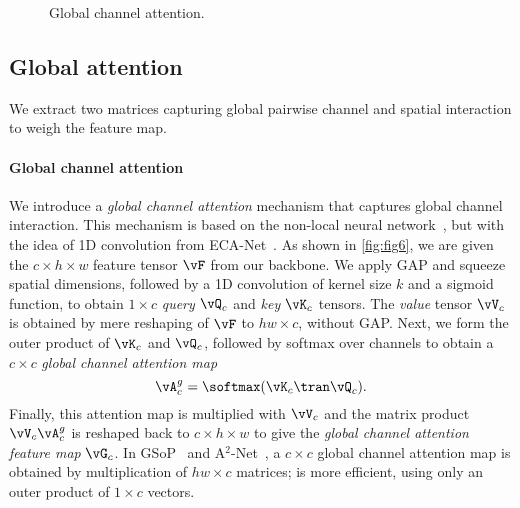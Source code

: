 \begin{figure}
\centering

\caption{Global channel attention.}
\label{fig:fig6}
\end{figure}


\subsection{Global attention}
\label{sec:global}

We extract two matrices capturing global pairwise channel and spatial interaction to weigh the feature map.


\paragraph{Global channel attention}

We introduce a \emph{global channel attention} mechanism that captures global channel interaction. This mechanism is based on the non-local neural network~\cite{Wang02}, but with the idea of 1D convolution from ECA-Net~\cite{wang01}. As shown in \autoref{fig:fig6}, we are given the $c\times h\times w$ feature tensor $\vF$ from our backbone. We apply GAP and squeeze spatial dimensions, followed by a 1D convolution of kernel size $k$ and a sigmoid function, to obtain $1 \times c$ \emph{query} $\vQ_c$ and \emph{key} $\vK_c$ tensors. The \emph{value} tensor $\vV_c$ is obtained by mere reshaping of $\vF$ to $hw \times c$, without GAP. Next, we form the outer product of $\vK_c$ and $\vQ_c$, followed by softmax over channels to obtain a $c \times c$ \emph{global channel attention map}
\begin{equation}
	\vA_c^g = \softmax({\vK_c}\tran \vQ_c).
\label{eq:eq6-1}
\end{equation}
Finally, this attention map is multiplied with $\vV_c$ and the matrix product $\vV_c \vA_c^g$ is reshaped back to $c \times h \times w$ to give the \emph{global channel attention feature map} $\vG_c$. In GSoP~\cite{Gao_2019_CVPR} and A$^2$-Net~\cite{ChenKLYF18}, a $c \times c$ global channel attention map is obtained by multiplication of $hw \times c$ matrices;  is more efficient, using only an outer product of $1 \times c$ vectors.

